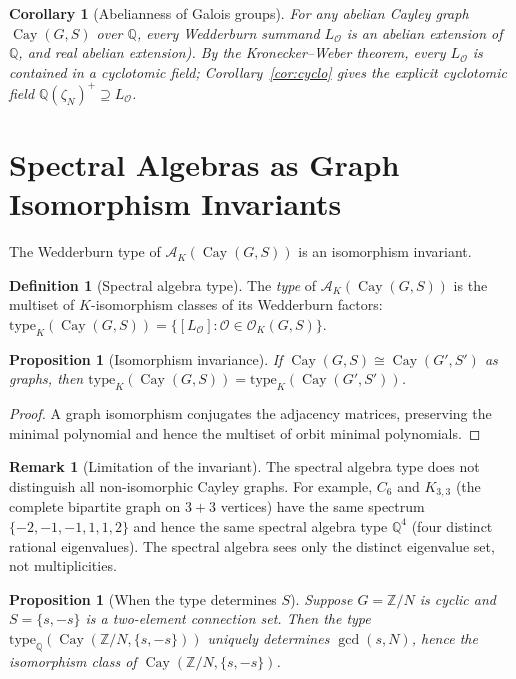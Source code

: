 \documentclass[12pt]{amsart}
\numberwithin{equation}{section}
\theoremstyle{plain}
\newtheorem{proposition}[theorem]{Proposition}
\newtheorem{corollary}[theorem]{Corollary}
\theoremstyle{definition}
\newtheorem{definition}[theorem]{Definition}
\newtheorem{remark}[theorem]{Remark}
\DeclareMathOperator{\Cay}{Cay}
\newcommand{\Z}{\mathbb{Z}}
\newcommand{\Q}{\mathbb{Q}}
\newcommand{\calA}{\mathcal{A}}
\newcommand{\calO}{\mathcal{O}}
\begin{document}
\begin{corollary}[Abelianness of Galois groups]
For any abelian Cayley graph $\Cay(G,S)$ over $\Q$, every Wedderburn
summand $L_\calO$ is an \emph{abelian} extension of $\Q$, and
real abelian extension).  By the Kronecker--Weber theorem, every $L_\calO$
is contained in a cyclotomic field; Corollary~\ref{cor:cyclo} gives the
explicit cyclotomic field $\Q(\zeta_N)^+ \supseteq L_\calO$.
\end{corollary}

\section{Spectral Algebras as Graph Isomorphism Invariants}
\label{sec:invariant}

The Wedderburn type of $\calA_K(\Cay(G,S))$ is an isomorphism invariant.

\begin{definition}[Spectral algebra type]
The \emph{type} of $\calA_K(\Cay(G,S))$ is the multiset of $K$-isomorphism
classes of its Wedderburn factors:
$\mathrm{type}_K(\Cay(G,S)) = \{[L_\calO] : \calO \in \calO_K(G,S)\}$.
\end{definition}

\begin{proposition}[Isomorphism invariance]
If $\Cay(G,S) \cong \Cay(G',S')$ as graphs, then
$\mathrm{type}_K(\Cay(G,S)) = \mathrm{type}_K(\Cay(G',S'))$.
\end{proposition}

\begin{proof}
A graph isomorphism conjugates the adjacency matrices, preserving the
minimal polynomial and hence the multiset of orbit minimal polynomials.
\end{proof}

\begin{remark}[Limitation of the invariant]
The spectral algebra type does not distinguish all non-isomorphic Cayley
graphs.  For example, $C_6$ and $K_{3,3}$ (the complete bipartite graph
on $3+3$ vertices) have the same spectrum $\{-2,-1,-1,1,1,2\}$ and hence
the same spectral algebra type $\Q^4$ (four distinct rational eigenvalues).
The spectral algebra sees only the distinct eigenvalue set, not multiplicities.
\end{remark}

\begin{proposition}[When the type determines $S$]
Suppose $G = \Z/N$ is cyclic and $S = \{s, -s\}$ is a two-element
connection set.  Then the type $\mathrm{type}_\Q(\Cay(\Z/N,\{s,-s\}))$
uniquely determines $\gcd(s, N)$, hence the isomorphism class of
$\Cay(\Z/N, \{s,-s\})$.
\end{proposition}
\end{document}
